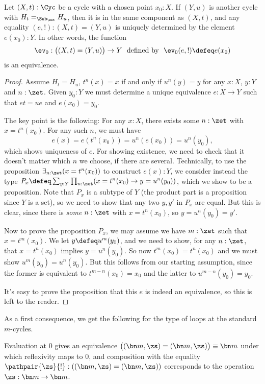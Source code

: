 \begin{lemma}\label{lem:IdCycle}
  Let $(X,t):\Cyc$ be a cycle with a chosen point $x_0:X$.
  If $(Y,u)$ is another cycle with $H_t=_{\Sub_\zet} H_u$,
  then it is in the same component as $(X,t)$,
  and any equality $(e,!) : (X,t)=(Y,u)$
  is uniquely determined by the element $e(x_0):Y$.
  In other words, the function
  \[
    \ev_0:\bigl((X,t)=(Y,u)\bigr)\to Y
    \text{~~defined by~~} \ev_0(e,!) \defeq e(x_0)
  \]
  is an equivalence.
\end{lemma}
\begin{proof}
  Assume $H_t=H_u$, \ie $t^n(x)=x$ if and only if $u^n(y)=y$
  for any $x:X$, $y:Y$ and $n:\zet$.
  Given $y_0:Y$ we must determine a unique equivalence $e:X\to Y$
  such that $et=ue$ and $e(x_0)=y_0$.

  The key point is the following: For any $x:X$, there exists some $n:\zet$
  with $x=t^n(x_0)$. For any such $n$, we must have
  \[
    e(x)=e(t^n(x_0))=u^n(e(x_0))=u^n(y_0),
  \]
  which shows uniqueness of $e$.
  For showing existence, we need to check that it doesn't matter which $n$ we choose, if there are several.
  Technically, to use the proposition $\exists_{n:\zet}(x=t^n(x_0))$ to construct $e(x):Y$, we consider instead the type $P_x\defeq\sum_{y:Y}\prod_{n:\zet}(x=t^n(x_0) \to y=u^n(y_0))$, which we show to be a proposition.
  Note that $P_x$ is a subtype of $Y$
  (the product part is a proposition since $Y$ is a set),
  so we need to show that any two $y,y'$ in $P_x$ are equal.
  But this is clear, since there is \emph{some} $n:\zet$ with $x=t^n(x_0)$,
  so $y=u^n(y_0)=y'$.

  Now to prove the proposition $P_x$,
  we may assume we have $m:\zet$ such that $x=t^m(x_0)$.
  We let $y\defeq u^m(y_0)$, and we need to show, for any $n:\zet$,
  that $x=t^n(x_0)$ implies $y=u^n(y_0)$.
  So now $t^m(x_0)=t^n(x_0)$ and we must show $u^m(y_0)=u^n(y_0)$.
  But this follows from our starting assumption, since
  the former is equivalent to $t^{m-n}(x_0)=x_0$
  and the latter to $u^{m-n}(y_0)=y_0$.

  It's easy to prove the proposition that this $e$ is indeed an equivalence,
  so this is left to the reader.
\end{proof}
As a first consequence,
we get the following for the type of loops at the standard $m$-cycles.
\begin{corollary}\label{cor:id-m-cycle}
  Evaluation at $0$ gives an equivalence
  $\bigl((\bn m,\zs)=(\bn m,\zs)\bigr) \equiv \bn m$ under which
  reflexivity maps to $0$, and composition with the equality
  $\pathpair{\zs}{!}: ((\bn m,\zs)=(\bn m,\zs))$
  corresponds to the operation $\zs:\bn m\to\bn m$.
\end{corollary}

